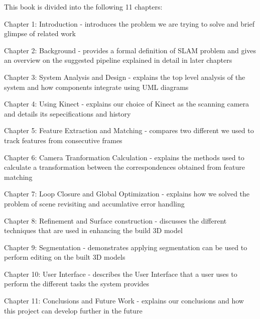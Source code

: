 This book is divided into the following 11 chapters:

\hbox{}
Chapter 1: Introduction - introduces the problem we are trying to solve and 
brief glimpse of related work

\hbox{}
Chapter 2: Background - provides a formal definition of SLAM problem and gives an overview on the suggested pipeline explained in detail in later chapters

\hbox{}
Chapter 3: System Analysis and Design - explains the top level analysis of the system and how components integrate using UML diagrams

\hbox{}
Chapter 4: Using Kinect - explains our choice of Kinect as the scanning camera and details its sepecifications and history

\hbox{}
Chapter 5: Feature Extraction and Matching - compares two different we used to track features from consecutive frames

\hbox{}
Chapter 6: Camera Tranformation Calculation - explains the methods used to calculate a transformation between the correspondences obtained from feature matching

\hbox{}
Chapter 7: Loop Closure and Global Optimization - explains how we solved the problem of scene revisiting and accumlative error handling

\hbox{}
Chapter 8: Refinement and Surface construction - discusses the different techniques that are used in enhancing the build 3D model

\hbox{}
Chapter 9: Segmentation - demonstrates applying segmentation can be used to perform editing on the built 3D models

\hbox{}
Chapter 10: User Interface - describes the User Interface that a user uses to perform the different tasks the system provides

\hbox{}
Chapter 11: Conclusions and Future Work - explains our conclusions and how this project can develop further in the future

